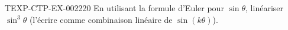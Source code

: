 \begin{exercice}{TEXP-CTP-EX-002}{2}{20}
En utilisant la formule d'Euler pour $\sin\theta$, linéariser $\sin^3\theta$ (l'écrire comme combinaison linéaire de $\sin(k\theta)$).
\end{exercice}
